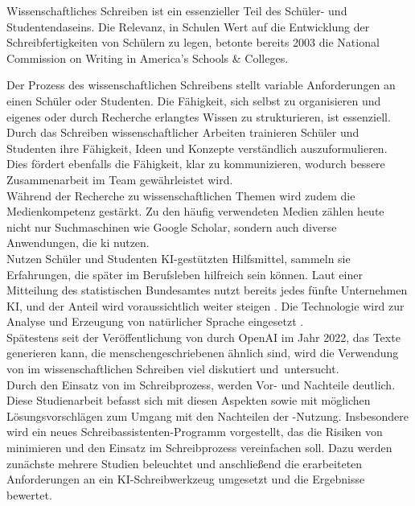 \documentclass[../main.tex]{subfiles}
\begin{document}
Wissenschaftliches Schreiben ist ein essenzieller Teil des Schüler- und Studentendaseins. Die Relevanz, in Schulen Wert auf die Entwicklung der Schreibfertigkeiten von Schülern zu legen, %
betonte bereits 2003 die National Commission on Writing in America’s Schools \& Colleges\cite{nationalcommissionwriting}. %

Der Prozess des wissenschaftlichen Schreibens stellt variable Anforderungen an einen Schüler oder Studenten.%
Die Fähigkeit, sich selbst zu organisieren und eigenes oder durch Recherche erlangtes Wissen zu strukturieren, ist essenziell. 
Durch das Schreiben wissenschaftlicher Arbeiten trainieren Schüler und Studenten ihre Fähigkeit, Ideen und Konzepte verständlich auszuformulieren. Dies fördert ebenfalls die Fähigkeit, klar zu 
kommunizieren, wodurch bessere Zusammenarbeit im Team gewährleistet wird.\cite{nationalcommissionwriting,teachers,humanWritingToAi} \\ 
Während der Recherche zu wissenschaftlichen Themen wird zudem die Medienkompetenz gestärkt. Zu den häufig verwendeten Medien zählen heute nicht nur Suchmaschinen wie Google Scholar, sondern 
auch diverse Anwendungen, die \gls{ki} nutzen.\\ Nutzen Schüler und Studenten KI-gestützten Hilfsmittel, sammeln sie Erfahrungen, die später im Berufsleben hilfreich sein können. Laut 
einer Mitteilung des statistischen Bundesamtes nutzt bereits jedes fünfte Unternehmen KI, und der Anteil wird voraussichtlich weiter steigen \cite{statistischesBundesamt}. 
Die Technologie wird zur Analyse und Erzeugung von natürlicher Sprache eingesetzt \cite{statistischesBundesamt}.\\ 
Spätestens seit der Veröffentlichung von  durch OpenAI im Jahr 2022, das Texte generieren kann, die menschengeschriebenen ähnlich sind, wird die Verwendung von 
 im wissenschaftlichen Schreiben viel diskutiert \mbox{und untersucht. \cite{humanWritingToAi,ZukunftWissenschaftlichesPublizieren}}\\
Durch den Einsatz von  im Schreibprozess, werden Vor- und Nachteile deutlich. Diese Studienarbeit befasst sich mit diesen 
Aspekten sowie mit möglichen Lösungsvorschlägen zum Umgang mit den Nachteilen der -Nutzung. Insbesondere wird ein neues Schreibassistenten-Programm vorgestellt, das 
die Risiken von  minimieren und den Einsatz im Schreibprozess vereinfachen soll. Dazu werden zunächste mehrere Studien beleuchtet und anschließend die erarbeiteten Anforderungen an ein KI-Schreibwerkzeug
umgesetzt und die Ergebnisse bewertet.
\end{document}
